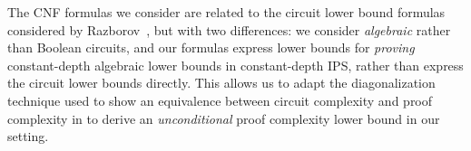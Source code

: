 \documentclass[11pt,letter]{article}
\theoremstyle{remark} %
\begin{document}


The CNF formulas we consider are related to the circuit lower bound formulas considered by Razborov~\cite{Razb95, Razb95a, Razb98, Razb15-annals}, but with two differences: 
we consider {\it algebraic} rather than Boolean circuits, and our formulas express lower bounds for {\it proving} constant-depth algebraic lower bounds in constant-depth IPS, rather than express the circuit lower bounds directly. This allows us to adapt the diagonalization technique used to show an equivalence between circuit complexity and proof complexity in \cite{ST25} to derive an {\it unconditional} proof complexity lower bound in our setting.
\end{document}
